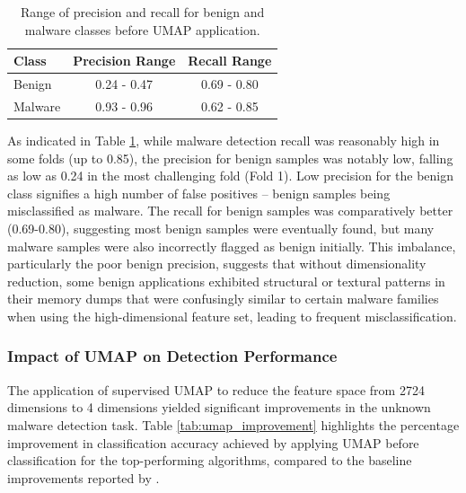 \begin{table}[h!]
  \centering
  \captionsetup{labelformat=empty, textformat=simple}
  \caption{TABLE IV: CLASS-SPECIFIC METRICS BEFORE UMAP}
  \label{tab:pre_umap_metrics}
  \begin{tabular}{lcc}
    \toprule
    \textbf{Class} & \textbf{Precision Range} & \textbf{Recall Range} \\
    \midrule
    Benign         & 0.24 - 0.47 & 0.69 - 0.80 \\
    Malware        & 0.93 - 0.96 & 0.62 - 0.85 \\
    \bottomrule
  \end{tabular}
  \vspace{0.2cm} %
  \caption*{Range of precision and recall for benign and malware classes before UMAP application.} %
\end{table}

As indicated in Table \ref{tab:pre_umap_metrics}, while malware detection recall was reasonably high in some folds (up to 0.85), the precision for benign samples was notably low, falling as low as 0.24 in the most challenging fold (Fold 1). Low precision for the benign class signifies a high number of false positives – benign samples being misclassified as malware. The recall for benign samples was comparatively better (0.69-0.80), suggesting most benign samples were eventually found, but many malware samples were also incorrectly flagged as benign initially. This imbalance, particularly the poor benign precision, suggests that without dimensionality reduction, some benign applications exhibited structural or textural patterns in their memory dumps that were confusingly similar to certain malware families when using the high-dimensional feature set, leading to frequent misclassification.

\subsubsection{Impact of UMAP on Detection Performance}
\label{subsubsec:umap_impact}

The application of supervised UMAP to reduce the feature space from 2724 dimensions to 4 dimensions yielded significant improvements in the unknown malware detection task. Table \ref{tab:umap_improvement} highlights the percentage improvement in classification accuracy achieved by applying UMAP before classification for the top-performing algorithms, compared to the baseline improvements reported by \cite{bozkir2021catch}.

